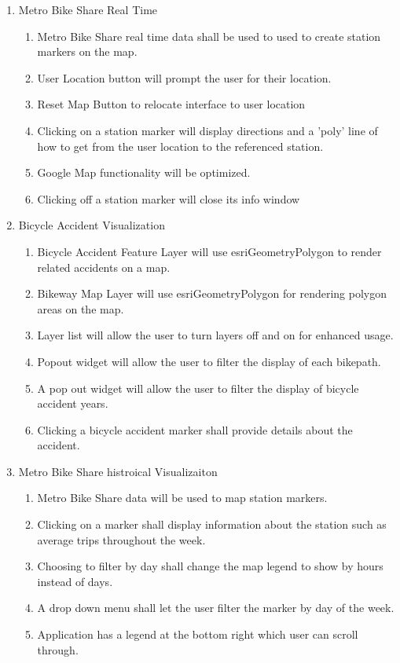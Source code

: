 \documentclass[a4paper,12pt]{article}
\begin{document}
\begin{enumerate}
    \item Metro Bike Share Real Time
    \begin{enumerate}
        \item Metro Bike Share real time data shall be used to used to create station markers on the map.
        \item User Location button will prompt the user for their location.
        \item Reset Map Button to relocate interface to user location
        \item Clicking on a station marker will display directions and a 'poly' line of how to get from the user location to the referenced station.
        \item Google Map functionality will be optimized.
        \item Clicking off a station marker will close its info window
    \end{enumerate}
    \item Bicycle Accident Visualization
    \begin{enumerate}
        \item Bicycle Accident Feature Layer will use esriGeometryPolygon to render related accidents on a map.
        \item Bikeway Map Layer will use esriGeometryPolygon for rendering polygon areas on the map.
        \item Layer list will allow the user to turn layers off and on for enhanced usage.
        \item Popout widget will allow the user to filter the display of each bikepath.
        \item A pop out widget will allow the user to filter the display of bicycle accident years.
        \item Clicking a bicycle accident marker shall provide details about the accident.
        
    \end{enumerate}
    \item Metro Bike Share histroical Visualizaiton 
    \begin{enumerate}
        \item Metro Bike Share data will be used to map station markers.
        \item Clicking on a marker shall display information about the station such as average trips throughout the week.
        \item Choosing to filter by day shall change the map legend to show by hours instead of days.
        \item A drop down menu shall let the user filter the marker by day of the week.
        \item Application has a legend at the bottom right which user can scroll through. 
    \end{enumerate}
\end{enumerate}
\end{document}
